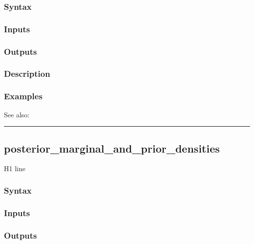 \documentclass[letterpaper,10pt,english]{sphinxmanual}
\begin{document}
\subsubsection{Syntax}
\label{classes/models/@dsge/dsge:id103}

\subsubsection{Inputs}
\label{classes/models/@dsge/dsge:id104}

\subsubsection{Outputs}
\label{classes/models/@dsge/dsge:id105}

\subsubsection{Description}
\label{classes/models/@dsge/dsge:id106}

\subsubsection{Examples}
\label{classes/models/@dsge/dsge:id107}
See also:


\bigskip\hrule{}\bigskip



\subsection{posterior\_marginal\_and\_prior\_densities}
\label{classes/models/@dsge/dsge:id108}\label{classes/models/@dsge/dsge:posterior-marginal-and-prior-densities}
H1 line


\subsubsection{Syntax}
\label{classes/models/@dsge/dsge:id109}

\subsubsection{Inputs}
\label{classes/models/@dsge/dsge:id110}

\subsubsection{Outputs}
\label{classes/models/@dsge/dsge:id111}
\end{document}
